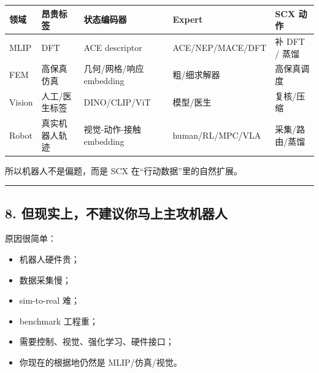 \documentclass[
  12pt,
]{ctexart}
\providecommand{\tightlist}{%
  \setlength{\itemsep}{0pt}\setlength{\parskip}{0pt}}
\begin{document}
\begin{longtable}[]{@{}
  >{\raggedright\arraybackslash}p{}
  >{\raggedright\arraybackslash}p{}
  >{\raggedright\arraybackslash}p{}
  >{\raggedright\arraybackslash}p{}
  >{\raggedright\arraybackslash}p{}@{}}
\toprule\noalign{}
\begin{minipage}[b]{\linewidth}\raggedright
领域
\end{minipage} & \begin{minipage}[b]{\linewidth}\raggedright
昂贵标签
\end{minipage} & \begin{minipage}[b]{\linewidth}\raggedright
状态编码器
\end{minipage} & \begin{minipage}[b]{\linewidth}\raggedright
Expert
\end{minipage} & \begin{minipage}[b]{\linewidth}\raggedright
SCX 动作
\end{minipage} \\
\midrule\noalign{}
\endhead
\bottomrule\noalign{}
\endlastfoot
MLIP & DFT & ACE descriptor & ACE/NEP/MACE/DFT & 补 DFT / 蒸馏 \\
FEM & 高保真仿真 & 几何/网格/响应 embedding & 粗/细求解器 &
高保真调度 \\
Vision & 人工/医生标签 & DINO/CLIP/ViT & 模型/医生 & 复核/压缩 \\
Robot & 真实机器人轨迹 & 视觉-动作-接触 embedding & human/RL/MPC/VLA &
采集/路由/蒸馏 \\
\end{longtable}

所以机器人不是偏题，而是 SCX 在``行动数据''里的自然扩展。

\begin{center}\rule{0.5\linewidth}{0.5pt}\end{center}

\subsection{8.
但现实上，不建议你马上主攻机器人}\label{ux4f46ux73b0ux5b9eux4e0aux4e0dux5efaux8baeux4f60ux9a6cux4e0aux4e3bux653bux673aux5668ux4eba}

原因很简单：

\begin{itemize}
\tightlist
\item
  机器人硬件贵；
\item
  数据采集慢；
\item
  sim-to-real 难；
\item
  benchmark 工程重；
\item
  需要控制、视觉、强化学习、硬件接口；
\item
  你现在的根据地仍然是 MLIP/仿真/视觉。
\end{itemize}
\end{document}
